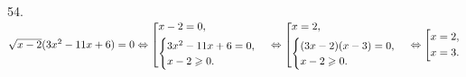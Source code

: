 54. $\sqrt{x-2}(3x^2-11x+6)=0\Leftrightarrow\left[\begin{gathered}
     x-2=0,\hfill\\
     \begin{cases}3x^2-11x+6=0,\\x-2\geqslant0.\end{cases}\hfill \end{gathered}\right.\Leftrightarrow\left[\begin{gathered}
     x=2,\hfill\\
     \begin{cases}(3x-2)(x-3)=0,\\x-2\geqslant0.\end{cases}\hfill \end{gathered}\right.\Leftrightarrow\left[\begin{gathered}
     x=2,\hfill\\
     x=3.\hfill \end{gathered}\right.$\\
